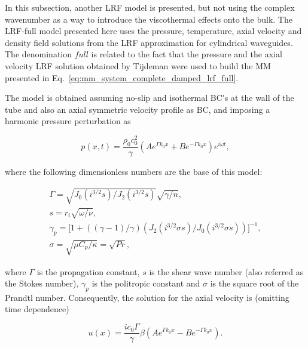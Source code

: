 \documentclass[12pt]{article}
\begin{document}
In this subsection, another \acrshort{LRF} model is presented, but not using the complex wavenumber as a way to introduce the viscothermal effects onto the bulk. The \acrshort{LRF}-full model presented here uses the pressure, temperature, axial velocity and density field solutions from the \acrshort{LRF} approximation for cylindrical waveguides. The denomination $full$ is related to the fact that the pressure and the axial velocity \acrshort{LRF} solution obtained by Tijdeman \cite{TIJDEMAN19751} were used to build the \acrshort{MM} presented in  Eq.~\ref{eq:mm_system_complete_damped_lrf_full}.

The model is obtained assuming no-slip and isothermal \acrshort{BC's} at the wall of the tube and also an axial symmetric velocity profile as \acrshort{BC}, and imposing a harmonic pressure perturbation as

\begin{equation} \label{eq:pressure_lrf_full}
	p(x,t) = \frac{\rho_0 c_0^2  }{\gamma} ( A e^{\Gamma k_0 x } + B e^{- \Gamma k_0 x} ) e^{i \omega t},
\end{equation}

\noindent where the following dimensionless numbers are the base of this model:

\begin{gather}
	\Gamma = \sqrt{ J_0(i^{3/2} s)   / J_2(i^{3/2} s) } \sqrt{  \gamma / n }, \\
	s = r_i \sqrt{\omega / \nu}, \\
	\gamma_p = \Big[ 1 + ((\gamma-1)/\gamma) ( J_2(i^{3/2} \sigma s)   / J_0(i^{3/2} \sigma s)  )\Big]^{-1}, \\
	\sigma = \sqrt{\mu C_p / \kappa} = \sqrt{Pr},
\end{gather}

\noindent where $\Gamma$ is the propagation constant, $s$ is the shear wave number (also referred as the Stokes number), $\gamma_p$ is the politropic constant and $\sigma$ is the square root of the Prandtl number. Consequently, the solution for the axial velocity is (omitting time dependence)

\begin{equation} \label{eq:velocity_lrf_full}
	u(x) = \frac{i c_0 \Gamma}{\gamma} \beta ( A e^{\Gamma k_0 x } - B e^{- \Gamma k_0 x} ).
\end{equation}
\end{document}
